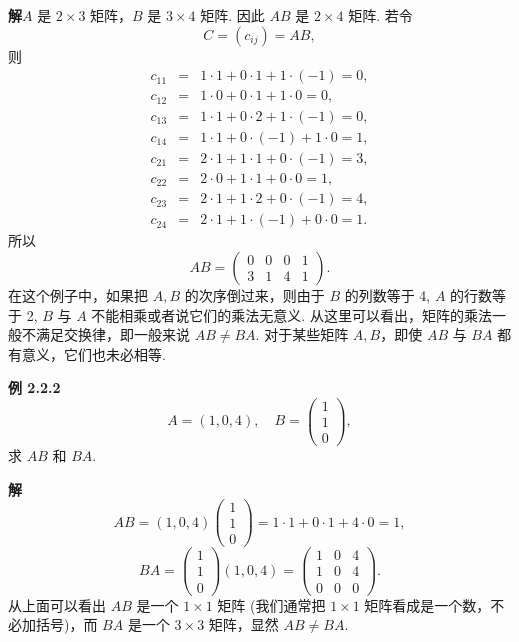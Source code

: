 \documentclass[UTF8, 12pt, fontset=fandol, oneside]{ctexart}
\begin{document}
\noindent\textbf{解}\quad $A$ 是 $2\times 3$ 矩阵，$B$ 是 $3\times 4$ 矩阵. 因此 $AB$ 是 $2\times 4$ 矩阵. 若令
\[
C=(c_{ij})=AB,
\]
则
\[
\begin{array}{rcl}
c_{11}&=&1\cdot 1+0\cdot 1+1\cdot(-1)=0,\\
c_{12}&=&1\cdot 0+0\cdot 1+1\cdot 0=0,\\
c_{13}&=&1\cdot 1+0\cdot 2+1\cdot(-1)=0,\\
c_{14}&=&1\cdot 1+0\cdot(-1)+1\cdot 0=1,\\
c_{21}&=&2\cdot 1+1\cdot 1+0\cdot(-1)=3,\\
c_{22}&=&2\cdot 0+1\cdot 1+0\cdot 0=1,\\
c_{23}&=&2\cdot 1+1\cdot 2+0\cdot(-1)=4,\\
c_{24}&=&2\cdot 1+1\cdot(-1)+0\cdot 0=1.
\end{array}
\]
所以
\[
AB=\left(\begin{array}{cccc}
0 & 0 & 0 & 1\\
3 & 1 & 4 & 1
\end{array}\right).
\]
在这个例子中，如果把 $A,B$ 的次序倒过来，则由于 $B$ 的列数等于 4, $A$ 的行数等于 2, $B$ 与 $A$ 不能相乘或者说它们的乘法无意义. 从这里可以看出，矩阵的乘法一般不满足交换律，即一般来说 $AB\ne BA$. 对于某些矩阵 $A,B$，即使 $AB$ 与 $BA$ 都有意义，它们也未必相等.

\noindent\textbf{例 2.2.2}\quad
\[
A=(1,0,4),\quad
B=\left(\begin{array}{c}
1\\
1\\
0
\end{array}\right),
\]
求 $AB$ 和 $BA$.

\noindent\textbf{解}\quad
\[
AB=(1,0,4)\left(\begin{array}{c}
1\\
1\\
0
\end{array}\right)=1\cdot 1+0\cdot 1+4\cdot 0=1,
\]
\[
BA=\left(\begin{array}{c}
1\\
1\\
0
\end{array}\right)(1,0,4)=
\left(\begin{array}{ccc}
1 & 0 & 4\\
1 & 0 & 4\\
0 & 0 & 0
\end{array}\right).
\]
从上面可以看出 $AB$ 是一个 $1\times 1$ 矩阵 (我们通常把 $1\times 1$ 矩阵看成是一个数，不必加括号)，而 $BA$ 是一个 $3\times 3$ 矩阵，显然 $AB\ne BA$.
\end{document}
